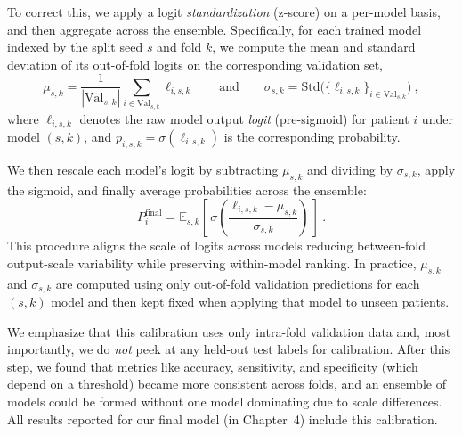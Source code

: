 To correct this, we apply a logit \emph{standardization} (z-score) on a per-model basis, and then aggregate across the ensemble. Specifically, for each trained model indexed by the split seed $s$ and fold $k$, we compute the mean and standard deviation of its out-of-fold logits on the corresponding validation set,
\begin{equation}\label{eq:calib_eq}
\mu_{s,k} = \frac{1}{|\mathrm{Val}_{s,k}|}\sum_{i\in \mathrm{Val}_{s,k}} \ell_{i,s,k}
\qquad\text{and}\qquad
\sigma_{s,k} = \mathrm{Std}\big(\{\ell_{i,s,k}\}_{i\in \mathrm{Val}_{s,k}}\big)~,
\end{equation}
where $\ell_{i,s,k}$ denotes the raw model output \emph{logit} (pre-sigmoid) for patient $i$ under model $(s,k)$, and $p_{i,s,k}=\sigma(\ell_{i,s,k})$ is the corresponding probability.

We then rescale each model’s logit by subtracting $\mu_{s,k}$ and dividing by $\sigma_{s,k}$, apply the sigmoid, and finally average probabilities across the ensemble:
\begin{equation}\label{eq:prob_rescale_ensemble}
P_i^{\text{final}} = \mathbb{E}_{s,k}\left[\, \sigma\!\left(\frac{\ell_{i,s,k} - \mu_{s,k}}{\sigma_{s,k}}\right)\,\right]~.
\end{equation}
This procedure aligns the scale of logits across models reducing between-fold output-scale variability while preserving within-model ranking. In practice, $\mu_{s,k}$ and $\sigma_{s,k}$ are computed using only out-of-fold validation predictions for each $(s,k)$ model and then kept fixed when applying that model to unseen patients.

We emphasize that this calibration uses only intra-fold validation data and, most importantly, we do \emph{not} peek at any held-out test labels for calibration. After this step, we found that metrics like accuracy, sensitivity, and specificity (which depend on a threshold) became more consistent across folds, and an ensemble of models could be formed without one model dominating due to scale differences. All results reported for our final model (in Chapter~4) include this calibration. 


